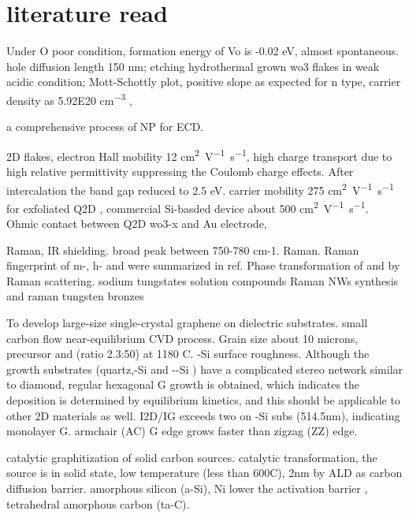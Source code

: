 \section{literature read}

Under O poor condition, formation energy of Vo is -0.02 eV, almost spontaneous.  hole diffusion length 150 nm; etching hydrothermal grown wo3 flakes in weak acidic condition; Mott-Schottly plot, positive slope as expected for n type, carrier density as 5.92E20 \si{cm^{-3}} \cite{Li2014g}, 

a comprehensive process of  NP for ECD. \cite{Wojcik2014}

2D  flakes, electron Hall mobility 12 \si{cm^2V^{-1}s^{-1}}, high charge transport due to high relative permittivity suppressing the Coulomb charge effects. \cite{Zhuiykov2014} After  intercalation the band gap reduced to 2.5 eV. carrier mobility 275 \si{cm^2V^{-1}s^{-1}} for exfoliated Q2D , commercial Si-basded device about 500 \si{cm^2V^{-1}s^{-1}}. Ohmic contact between Q2D wo3-x and Au electrode, 

\cite{Hutter2014}

 Raman, IR shielding.\cite{Guo2012} \cite{Guo2011}
broad peak between 750-780 cm-1.
 Raman. \cite{Knee1979}
Raman fingerprint of m-, h- and  were summarized in ref\cite{Daniel1987}.
Phase transformation of  and  by Raman scattering. \cite{Lima2011}
sodium tungstates solution compounds Raman \cite{Redkin2010}
 NWs synthesis and raman \cite{Ma2005}
tungsten bronzes \cite{Wiseman1976}



To develop large-size single-crystal graphene on dielectric substrates. small carbon flow near-equilibrium CVD process. Grain size about 10 microns, precursor  and  (ratio 2.3:50) at 1180 C. -Si surface roughness. Although the growth substrates (quartz,-Si and --Si ) have a complicated stereo network similar to diamond, regular hexagonal G growth is obtained, which indicates the deposition is determined by equilibrium kinetics, and this should be applicable to other 2D materials as well. I2D/IG exceeds two on -Si subs (514.5nm), indicating monolayer G. armchair (AC) G edge grows faster than zigzag (ZZ) edge.\cite{Chen2013j}

catalytic graphitization of solid carbon sources. catalytic transformation, the source is in solid state, low temperature (less than 600C), 2nm   by ALD as carbon diffusion barrier. amorphous silicon (a-Si), Ni lower the activation barrier ,  tetrahedral amorphous carbon (ta-C).\cite{Weatherup2013}

